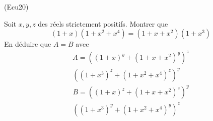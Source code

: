 \begin{tiny}(Ecu20)\end{tiny} Soit $x, y, z$ des réels strictement positifs.\newline
Montrer que
\begin{displaymath}
  (1+x)(1+x^2+x^4) = (1+x+x^2)(1+x^3)
\end{displaymath}
En déduire que $A=B$ avec
\begin{multline*}
A =\left( (1+x)^y + (1+x+x^2)^y\right)^z \\ \left( (1+x^3)^z + (1+x^2+x^4)^z \right)^y
\end{multline*}
\begin{multline*}
B = \left( (1+x)^z + (1+x+x^2)^z\right)^y \\ \left( (1+x^3)^y + (1+x^2+x^4)^y \right)^z  
\end{multline*}

